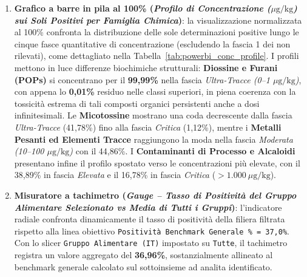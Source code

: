 \begin{enumerate}
    \item \textbf{Grafico a barre in pila al 100\% (\textit{Profilo di Concentrazione ($\mu\text{g/kg}$) sui Soli Positivi per Famiglia Chimica})}: la visualizzazione normalizzata al 100\% confronta la distribuzione delle sole determinazioni positive lungo le cinque fasce quantitative di concentrazione (escludendo la fascia 1 dei non rilevati), come dettagliato nella Tabella~\ref{tab:powerbi_conc_profile}. I profili mettono in luce differenze biochimiche strutturali: \textbf{Diossine e Furani (POPs)} si concentrano per il \textbf{99,99\%} nella fascia \textit{Ultra-Tracce (0--1 $\mu\text{g/kg}$)}, con appena lo \textbf{0,01\%} residuo nelle classi superiori, in piena coerenza con la tossicità estrema di tali composti organici persistenti anche a dosi infinitesimali. Le \textbf{Micotossine} mostrano una coda decrescente dalla fascia \textit{Ultra-Tracce} (41,78\%) fino alla fascia \textit{Critica} (1,12\%), mentre i \textbf{Metalli Pesanti ed Elementi Tracce} raggiungono la moda nella fascia \textit{Moderata (10--100 $\mu\text{g/kg}$)} con il 44,86\%. I \textbf{Contaminanti di Processo e Alcaloidi} presentano infine il profilo spostato verso le concentrazioni più elevate, con il 38,89\% in fascia \textit{Elevata} e il 16,78\% in fascia \textit{Critica} ($>1.000~\mu\text{g/kg}$).

    \item \textbf{Misuratore a tachimetro (\textit{Gauge -- Tasso di Positività del Gruppo Alimentare Selezionato vs Media di Tutti i Gruppi})}: l'indicatore radiale confronta dinamicamente il tasso di positività della filiera filtrata rispetto alla linea obiettivo \texttt{Positività Benchmark Generale \% = 37,0\%}. Con lo slicer \texttt{Gruppo Alimentare (IT)} impostato su \texttt{Tutte}, il tachimetro registra un valore aggregato del \textbf{36,96\%}, sostanzialmente allineato al benchmark generale calcolato sul sottoinsieme ad analita identificato.
\end{enumerate}

